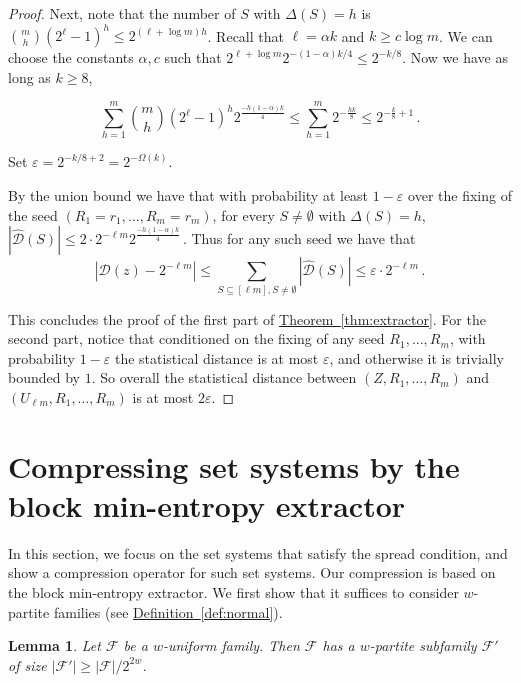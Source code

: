 \documentclass[11pt]{article}
\numberwithin{equation}{section}
\newtheorem{lemma}[theorem]{Lemma}
\theoremstyle{definition}
\theoremstyle{plain}
\newcommand{\expref}[2]{\hyperref[#2]{#1~\ref{#2}}}
\newcommand{\eps}{\varepsilon}
\newcommand{\calF}{\mathcal{F}} %
\newcommand{\calD}{\mathcal{D}} %
\begin{document}
\begin{proof}
Next, note that the number of $S$ with $\Delta(S)=h$ is 
$\binom{m}{h}(2^{\ell}-1)^h \leq  2^{(\ell+\log m)h}$. 
Recall that $\ell =\alpha k$ and $k\geq c \log m$. 
We can choose the constants $\alpha, c$ such that 
%
%
$2^{\ell+\log m} 2^{-(1-\alpha)k/4} \leq 2^{-k/8}$. 
Now we have as long as $k \geq 8$,

\begin{equation}
\sum_{h=1}^{m} \binom{m}{h}(2^{\ell}-1)^h 2^{\frac{-h(1-\alpha)k}{4}} \leq \sum_{h=1}^{m}2^{-\frac{hk}{8}} \leq 2^{-\frac{k}{8}+1}\,.
\end{equation}

Set
%
$\eps =2^{-k/8+2}=2^{-\Omega(k)}$. %

By the union bound we have that with probability at least $1-\eps$ over
the fixing of the seed
$(R_1=r_1, \ldots, R_m=r_m)$, for every $S \neq \emptyset$ with $\Delta(S)=h$,
$|\hat{\calD}(S) | \leq 2 \cdot 2^{-\ell m}2^{\frac{-h(1-\alpha)k}{4}}$\,. 
Thus for any such seed we have that
\begin{equation}
\left |{\calD}(z)-2^{-\ell m} \right |  \leq \sum_{S \subseteq [\ell m], S \neq \emptyset} \left |\hat{\calD}(S) \right | \leq \eps \cdot
2^{-\ell m}\,.
\end{equation}
  
This concludes the proof of the first part of \expref{Theorem}{thm:extractor}. For the second part, notice that conditioned on the fixing of any
seed $R_1,\ldots,R_m$, with probability $1-\eps$ the statistical distance is at most $\eps$, and otherwise it is trivially bounded by $1$.
So overall the statistical distance between
$(Z, R_1, \ldots, R_m)$ and $(U_{\ell m}, R_1, \ldots, R_m)$ is at most 
$2\eps$.
\end{proof}


%
%
%
%


\section{Compressing set systems by the block min-entropy extractor}
\label{sec:sunflower}

In this section, we focus on the set systems that satisfy the spread condition, and show a compression operator for such set systems.
Our compression is based on the block min-entropy extractor. We first show that it suffices to consider
%
$w$-partite families  %
(see \expref{Definition}{def:normal}).

\begin{lemma}
\label{lemma:normal}
Let $\calF$ be a
%
$w$-uniform family.  %
Then %
%
$\calF$ has a $w$-partite subfamily $\calF'$
of size $|\calF'|\geq|\calF|/2^{2w}$.   %
\end{lemma}
\end{document}
